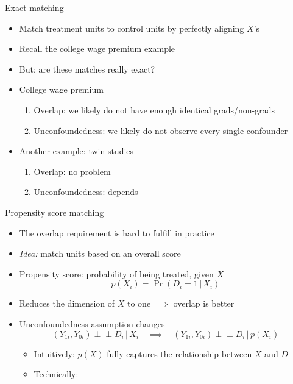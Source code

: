 \documentclass[aspectratio=169,compress,handout,t,xcolor=table]{beamer}
\providecommand{\indep}{\perp \!\!\!\! \perp}              %
\begin{document}
\begin{frame}{Exact matching}
  \begin{itemize}
    \item Match treatment units to control units by perfectly aligning \(X\)'s
    \item Recall the college wage premium example
    \item But: are these matches really exact?
    \item College wage premium
    \begin{enumerate}
      \item Overlap: we likely do not have enough identical grads/non-grads
      \item Unconfoundedness: we likely do not observe every single confounder
    \end{enumerate}
    \item Another example: twin studies
    \begin{enumerate}
      \item Overlap: no problem
      \item Unconfoundedness: depends
    \end{enumerate}
  \end{itemize}
\end{frame}

\begin{frame}{Propensity score matching}
  \begin{itemize}
    \item The overlap requirement is hard to fulfill in practice
    \item \emph{Idea:} match units based on an overall score
    \item Propensity score: probability of being treated, given \(X\)
    \begin{equation*}
      p(X_i) = \Pr (D_i=1 \,|\, X_i)
    \end{equation*}
    \item Reduces the dimension of \(X\) to one \(\implies\) overlap is better
    \item Unconfoundedness assumption changes
    \begin{equation*}
      (Y_{1i}, Y_{0i}) \indep D_i \,|\, X_i \quad \implies \quad (Y_{1i}, Y_{0i}) \indep D_i \,|\, p(X_i)
    \end{equation*}
    \begin{itemize}
      \item Intuitively: \(p(X)\) fully captures the relationship between \(X\) and \(D\)
      \item Technically: \citet*[][Biometrika]{Rosenbaum1983}
    \end{itemize}
  \end{itemize}
\end{frame}
\end{document}
